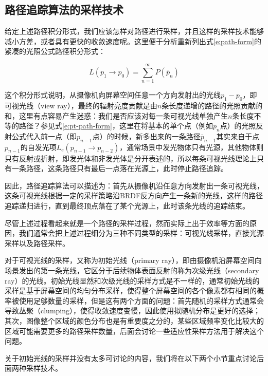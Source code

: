 \subsection{路径追踪算法的采样技术}
给定上述路径积分形式，我们应该怎样对路径进行采样，并且这样的采样技术能够减小方差，或者具有更快的收敛速度呢。这里便于分析重新列出式\ref{e:path-form}的紧凑的光照公式路径积分形式：

\begin{equation}
	L(p_1\to p_0)=\sum_{n=1}^{\infty}P(\bar{p}_n)
\end{equation}

\noindent 这个积分形式说明，从摄像机向屏幕空间任意一个方向发射出的光线$p_1-p_0$，即可视光线（view ray），最终的辐射亮度贡献是由$n$条长度递增的路径的光照贡献的和，这里有点容易产生迷惑：我们是否应该对每一条可视光线单独产生$n$条长度不等的路径？参见式\ref{e:pt-path-form}，这里在将基本的单个点（例如$p_n$点）的光照反射公式代入前一点（即$p_{n-1}$点）的时候，新多出来的一条路径$\bar{p}_{n-1}$其实来自于点$p_{n-1}$的自发光项$L_e(p_{n-1}\to p_{n-2})$，通常场景中发光物体只有光源，其他物体则只有反射或折射，即发光体和非发光体是分开表述的，所以每条可视光线理论上只有一条路径，这条路径只有最后一点落在光源上，此时停止路径追踪。

因此，路径追踪算法可以描述为：首先从摄像机沿任意方向发射出一条可视光线，这条可视光线根据一定的采样策略沿BRDF反方向产生一条新的光线，这样的路径追踪递归进行，直到最终顶点落在了某个光源上，此时该条光线的追踪结束。

尽管上述过程看起来就是一个路径的采样过程，然而实际上出于效率等方面的原因，我们通常会把上述过程细分为三种不同类型的采样：可视光线采样，直接光源采样以及路径采样。

对于可视光线的采样，又称为初始光线（primary ray），即由摄像机沿屏幕空间向场景发出的第一条光线，它区分于后续物体表面反射的称为次级光线（secondary ray）的光线。初始光线显然和次级光线的采样方式是不一样的，通常初始光线的采样是基于屏幕空间的均匀分布采样，使得整个屏幕空间的各个像素都有相同的概率被使用足够数量的采样，但是这有两个方面的问题：首先随机的采样方式通常会导致丛聚（clumping），使得收敛速度变慢，因此使用拟随机分布是更好的选择；其次，图像整个区域的颜色分布也是有重要度之分的，某些区域频率变化比较大的区域可能需要更多的路径采样数量，后面会讨论一些适应性采样方法用于解决这个问题。

关于初始光线的采样并没有太多可讨论的内容，我们将在以下两个小节重点讨论后面两种采样技术。






